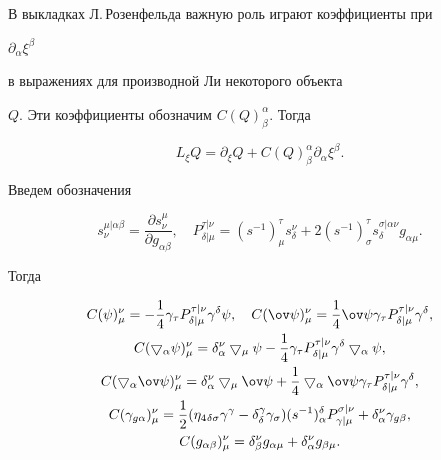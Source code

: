 В выкладках Л.\,Розенфельда важную роль играют коэффициенты при


$\partial_ \alpha\xi^\beta$


в выражениях для производной Ли некоторого объекта


$Q$. Эти коэффициенты обозначим $C(Q)^\alpha_\beta$. Тогда


$$


L_\xi Q=\partial_ \xi Q+C(Q)^\alpha_\beta\partial_\alpha\xi^\beta.


$$


Введем обозначения


$$


s^{\mu|\alpha\beta}_\nu=\frac{\partial s^\mu_\nu}


{\partial g_{\alpha\beta}},\quad


P^{\tau|\nu}_{\delta|\mu}=(s^{-1}{})^\tau_\mu s^\nu_\delta+


2(s^{-1}{})^\tau_\sigma s^{\sigma|\alpha\nu}_\delta g_{\alpha\mu}.


$$


Тогда


\begin{gather*}


C(\psi)^\nu_\mu=-\frac{1}{4}\gamma_\tau


P^{\tau|\nu}_{\delta|\mu}\gamma^\delta\psi,\quad


C(\ov\psi)^\nu_\mu=\frac{1}{4}\ov\psi\gamma_\tau


P^{\tau|\nu}_{\delta|\mu}\gamma^\delta, \\


%


C(\bigtriangledown_\alpha\psi)^\nu_\mu=


\delta^\nu_\alpha\bigtriangledown_\mu\psi-\frac{1}{4}\gamma_\tau


P^{\tau|\nu}_{\delta|\mu}\gamma^\delta


\bigtriangledown_\alpha\psi,\\


%


C(\bigtriangledown_\alpha\ov\psi)^\nu_\mu=


\delta^\nu_\alpha\bigtriangledown_\mu\ov\psi+


\frac{1}{4}\bigtriangledown_\alpha\ov\psi\gamma_\tau


P^{\tau|\nu}_{\delta|\mu}\gamma^\delta, \\


%


C(\gamma_{g\alpha})^\nu_\mu =\frac{1}{2}(\eta_4{}_{\delta


\sigma}\gamma^\gamma-\delta^\gamma_\delta\gamma_\sigma)


(s^{-1}{})^\delta_\alpha P^{\sigma|\nu}_{\gamma|\mu}+


\delta^\nu_\alpha\gamma_{g\beta}, \\


%


C(g_{\alpha\beta})^\nu_\mu=\delta^\nu_\beta g_{\alpha\mu}+


\delta^\nu_\alpha g_{\beta\mu}.


\end{gather*}



